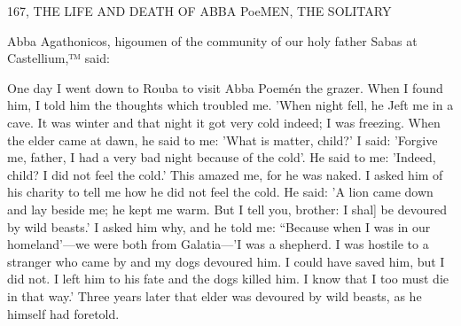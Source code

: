 167, THE LIFE AND DEATH OF ABBA
PoeMEN, THE SOLITARY

Abba Agathonicos, higoumen of the community of our holy father
Sabas at Castellium,™ said:

One day I went down to Rouba to visit Abba Poemén the grazer.
When I found him, I told him the thoughts which troubled me.
'When night fell, he Jeft me in a cave.
It was winter and that night
it got very cold indeed; I was freezing.
When the elder came at
dawn, he said to me: 'What is matter, child?' I said: 'Forgive me,
father, I had a very bad night because of the cold'.
He said to me:
'Indeed, child? I did not feel the cold.' This amazed me, for he was
naked.
I asked him of his charity to tell me how he did not feel the
cold.
He said: 'A lion came down and lay beside me; he kept me
warm.
But I tell you, brother: I shal] be devoured by wild beasts.'
I asked him why, and he told me: “Because when I was in our
homeland'—we were both from Galatia—'I was a shepherd.
I was
hostile to a stranger who came by and my dogs devoured him.
I
could have saved him, but I did not.
I left him to his fate and the
dogs killed him.
I know that I too must die in that way.' Three
years later that elder was devoured by wild beasts, as he himself had
foretold.

